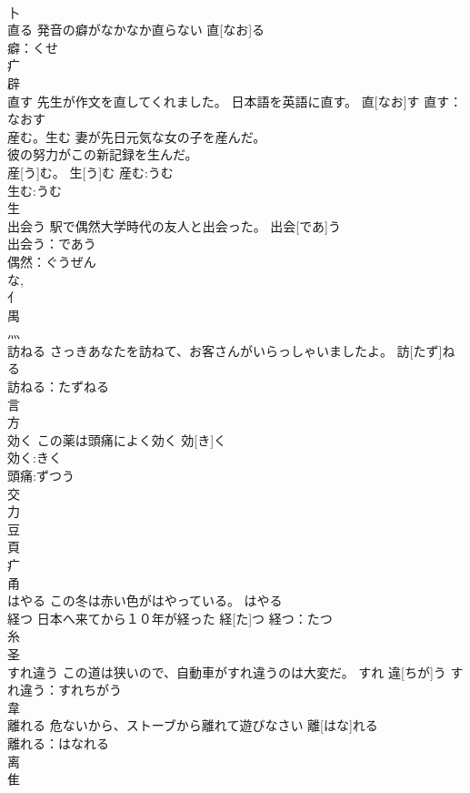 \documentclass[8pt]{extreport}
\begin{document}
\begin{CJK}{UTF8}{min}
\\	卜 
\\	直る	発音の癖がなかなか直らない	直[なお]る	
\\	癖：くせ
\\	疒 
\\	辟 
\\	直す	先生が作文を直してくれました。 日本語を英語に直す。	直[なお]す			直す：なおす
\\	産む。生む	妻が先日元気な女の子を産んだ。 
\\	彼の努力がこの新記録を生んだ。 
\\	産[う]む。 生[う]む			産む:うむ
\\	生む:うむ
\\	生 
\\	出会う	駅で偶然大学時代の友人と出会った。	出会[であ]う	
\\	出会う：であう
\\	偶然：ぐうぜん
\\	な, 
\\	亻 
\\	禺 
\\	灬 
\\	訪ねる	さっきあなたを訪ねて、お客さんがいらっしゃいましたよ。	訪[たず]ねる	
\\	訪ねる：たずねる
\\	言 
\\	方 
\\	効く	この薬は頭痛によく効く	効[き]く			
\\	効く:きく
\\	頭痛:ずつう
\\	交 
\\	力 
\\	豆 
\\	頁 
\\	疒 
\\	甬 
\\	はやる	この冬は赤い色がはやっている。	はやる			
\\	経つ	日本へ来てから１０年が経った	経[た]つ			経つ：たつ
\\	糸 
\\	圣 
\\	すれ違う	この道は狭いので、自動車がすれ違うのは大変だ。	すれ 違[ちが]う			すれ違う：すれちがう
\\	韋 
\\	離れる	危ないから、ストーブから離れて遊びなさい	離[はな]れる	
\\	離れる：はなれる
\\	离 
\\	隹 

\end{CJK}
\end{document}
